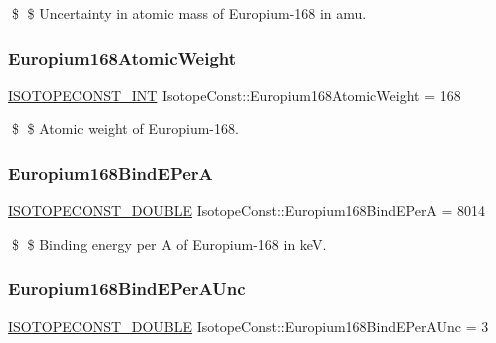 \$ \$ Uncertainty in atomic mass of Europium-\/168 in amu. \mbox{\label{group___isotope_const-_europium-_eu168_ga82ebe05e17123353bb9940b9b6e55fa0}} 
\subsubsection{\texorpdfstring{Europium168\+Atomic\+Weight}{Europium168AtomicWeight}}
{\footnotesize\ttfamily \mbox{\hyperlink{group___isotope_const-_macros_ga5f18360b3e99483a35c32d789e62621c}{I\+S\+O\+T\+O\+P\+E\+C\+O\+N\+S\+T\+\_\+\+I\+NT}} Isotope\+Const\+::\+Europium168\+Atomic\+Weight = 168}

\$ \$ Atomic weight of Europium-\/168. \mbox{\label{group___isotope_const-_europium-_eu168_ga75d37ff1e4c3d96d4d35cb948c880b3f}} 
\subsubsection{\texorpdfstring{Europium168\+Bind\+E\+PerA}{Europium168BindEPerA}}
{\footnotesize\ttfamily \mbox{\hyperlink{group___isotope_const-_macros_ga8f45a7272ce02c0b4c65c44636ed719a}{I\+S\+O\+T\+O\+P\+E\+C\+O\+N\+S\+T\+\_\+\+D\+O\+U\+B\+LE}} Isotope\+Const\+::\+Europium168\+Bind\+E\+PerA = 8014}

\$ \$ Binding energy per A of Europium-\/168 in keV. \mbox{\label{group___isotope_const-_europium-_eu168_ga9bcd30bf7b9aad2326c2b4fe610b8f5c}} 
\subsubsection{\texorpdfstring{Europium168\+Bind\+E\+Per\+A\+Unc}{Europium168BindEPerAUnc}}
{\footnotesize\ttfamily \mbox{\hyperlink{group___isotope_const-_macros_ga8f45a7272ce02c0b4c65c44636ed719a}{I\+S\+O\+T\+O\+P\+E\+C\+O\+N\+S\+T\+\_\+\+D\+O\+U\+B\+LE}} Isotope\+Const\+::\+Europium168\+Bind\+E\+Per\+A\+Unc = 3}

